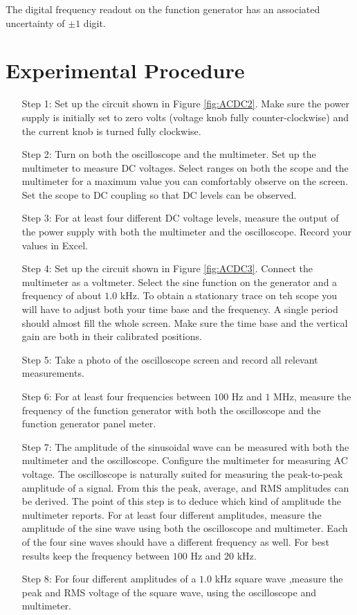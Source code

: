 \noindent The digital frequency readout on the function generator has an associated uncertainty of $\pm 1$ digit.

\section{Experimental Procedure}


\begin{itemize}[leftmargin = 50pt]
    \item[Step 1:] Set up the circuit shown in Figure \ref{fig:ACDC2}. Make sure the power supply is initially set to zero volts (voltage knob fully counter-clockwise) and the current knob is turned fully clockwise.
    \item[Step 2:] Turn on both the oscilloscope and the multimeter. Set up the multimeter to measure DC voltages. Select ranges on both the scope and the multimeter for a maximum value you can comfortably observe on the screen. Set the scope to DC coupling so that DC levels can be observed.
    \item[Step 3:] For at least four different DC voltage levels, measure the output of the power supply with both the multimeter and the oscilloscope. Record your values in Excel.
    \item[Step 4:] Set up the circuit shown in Figure \ref{fig:ACDC3}. Connect the multimeter as a voltmeter. Select the sine function on the generator and a frequency of about $1.0$ kHz. To obtain a stationary trace on teh scope you will have to adjust both your time base and the frequency. A single period should almost fill the whole screen. Make sure the time base and the vertical gain are both in their calibrated positions.
    \item[Step 5:] Take a photo of the oscilloscope screen and record all relevant measurements.
    \item[Step 6:] For at least four frequencies between $100$ Hz and $1$ MHz, measure the frequency of the function generator with both the oscilloscope and the function generator panel meter. 
    \item[Step 7:] The amplitude of the sinusoidal wave can be measured with both the multimeter and the oscilloscope. Configure the multimeter for measuring AC voltage. The oscilloscope is naturally suited for measuring the peak-to-peak amplitude of a signal. From this the peak, average, and RMS amplitudes can be derived. The point of this step is to deduce which kind of amplitude the multimeter reports. For at least four different amplitudes, measure the amplitude of the sine wave using both the oscilloscope and multimeter. Each of the four sine waves should have a different frequency as well. For best results keep the frequency between $100$ Hz and $20$ kHz.
    \item[Step 8:] For four different amplitudes of a $1.0$ kHz square wave ,measure the peak and RMS voltage of the square wave, using the oscilloscope and multimeter.
\end{itemize}

